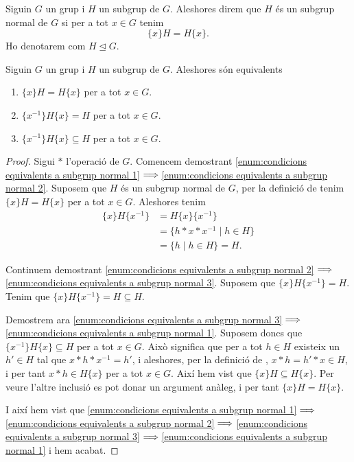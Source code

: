\documentclass[../Apunts.tex]{subfiles}
\begin{document}
	\begin{definition}
		\label{def:subgrup normal}
		Siguin \(G\) un grup i \(H\) un subgrup de \(G\). Aleshores direm que \(H\) és un subgrup normal de \(G\) si per a tot \(x\in G\) tenim
		\[\{x\}H=H\{x\}.\]
		Ho denotarem com \(H\trianglelefteq G\).
	\end{definition}
	\begin{proposition}
		\label{prop:condicions equivalents a subgrup normal}
		Siguin \(G\) un grup i \(H\) un subgrup de \(G\). Aleshores són equivalents
		\begin{enumerate}
			\item\label{enum:condicions equivalents a subgrup normal 1} \(\{x\}H=H\{x\}\) per a tot \(x\in G\).
			\item\label{enum:condicions equivalents a subgrup normal 2} \(\{x^{-1}\}H\{x\}=H\) per a tot \(x\in G\).
			\item\label{enum:condicions equivalents a subgrup normal 3} \(\{x^{-1}\}H\{x\}\subseteq H\) per a tot \(x\in G\).
		\end{enumerate}
		\begin{proof}
			Sigui \(\ast\) l'operació de \(G\). Comencem demostrant \eqref{enum:condicions equivalents a subgrup normal 1}\(\implies\)\eqref{enum:condicions equivalents a subgrup normal 2}. Suposem que \(H\) és un subgrup normal de \(G\), per la definició de  tenim \(\{x\}H=H\{x\}\) per a tot \(x\in G\). Aleshores tenim
			\begin{align*}
			\{x\}H\{x^{-1}\}&=H\{x\}\{x^{-1}\}\\
			&=\{h\ast x\ast x^{-1}\mid h\in H\}\\
			&=\{h\mid h\in H\}=H.
			\end{align*}
			
			Continuem demostrant \eqref{enum:condicions equivalents a subgrup normal 2}\(\implies\)\eqref{enum:condicions equivalents a subgrup normal 3}. Suposem que \(\{x\}H\{x^{-1}\}=H\). Tenim que \(\{x\}H\{x^{-1}\}=H\subseteq H\).
			
			Demostrem ara \eqref{enum:condicions equivalents a subgrup normal 3}\(\implies\)\eqref{enum:condicions equivalents a subgrup normal 1}. Suposem doncs que \(\{x^{-1}\}H\{x\}\subseteq H\) per a tot \(x\in G\). Això significa que per a tot \(h\in H\) existeix un \(h'\in H\) tal que \(x\ast h\ast x^{-1}=h'\), i aleshores, per la definició de , \(x\ast h=h'\ast x\in H\), i per tant \(x\ast h\in H\{x\}\) per a tot \(x\in G\). Així hem vist que \(\{x\}H\subseteq H\{x\}\). Per veure l'altre inclusió es pot donar un argument anàleg, i per tant \(\{x\}H= H\{x\}\). %
			
			I així hem vist que \eqref{enum:condicions equivalents a subgrup normal 1}\(\implies\)\eqref{enum:condicions equivalents a subgrup normal 2}\(\implies\)\eqref{enum:condicions equivalents a subgrup normal 3}\(\implies\)\eqref{enum:condicions equivalents a subgrup normal 1} i hem acabat.
		\end{proof}
	\end{proposition}
\end{document}
